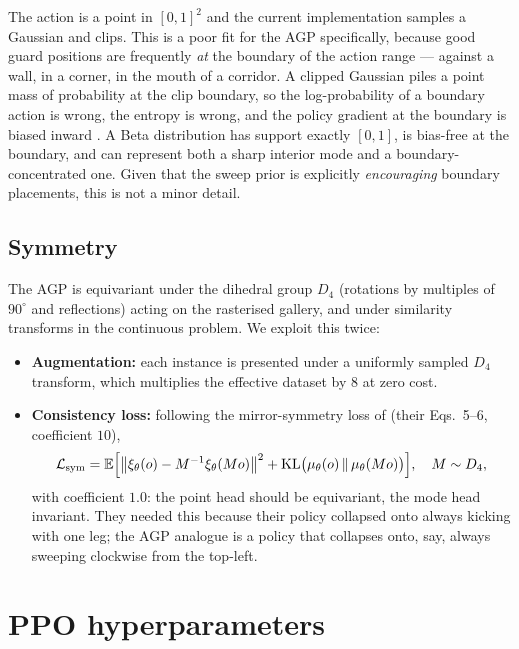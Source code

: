 \documentclass[11pt,a4paper]{article}
\begin{document}
The action is a point in $[0,1]^2$ and the current implementation samples a Gaussian and
clips. This is a poor fit for the AGP specifically, because good guard positions are
frequently \emph{at} the boundary of the action range --- against a wall, in a corner, in the
mouth of a corridor. A clipped Gaussian piles a point mass of probability at the clip
boundary, so the log-probability of a boundary action is wrong, the entropy is wrong, and the
policy gradient at the boundary is biased inward \cite{chou2017beta}. A Beta distribution has
support exactly $[0,1]$, is bias-free at the boundary, and can represent both a sharp
interior mode and a boundary-concentrated one. Given that the \stageI{} sweep prior is
explicitly \emph{encouraging} boundary placements, this is not a minor detail.

\subsection{Symmetry}

The AGP is equivariant under the dihedral group $D_4$ (rotations by multiples of $90^\circ$
and reflections) acting on the rasterised gallery, and under similarity transforms in the
continuous problem. We exploit this twice:

\begin{itemize}
  \item \textbf{Augmentation:} each instance is presented under a uniformly sampled $D_4$
        transform, which multiplies the effective dataset by $8$ at zero cost.
  \item \textbf{Consistency loss:} following the mirror-symmetry loss of
        \citet{wang2025vision} (their Eqs.~5--6, coefficient $10$),
        \[
          \mathcal{L}_{\mathrm{sym}}
          = \mathbb{E}\Bigl[\bigl\lVert \xi_\theta(o) - M^{-1}\xi_\theta(M o)\bigr\rVert^2
          + \mathrm{KL}\bigl(\mu_\theta(o)\,\Vert\,\mu_\theta(M o)\bigr)\Bigr],
          \quad M \sim D_4 ,
        \]
        with coefficient $1.0$: the point head should be equivariant, the mode head
        invariant. They needed this because their policy collapsed onto always kicking with
        one leg; the AGP analogue is a policy that collapses onto, say, always sweeping
        clockwise from the top-left.
\end{itemize}

\section{PPO hyperparameters}
\end{document}
